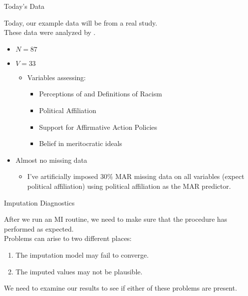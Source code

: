 \documentclass{beamer}
\begin{document}
\begin{frame}{Today's Data}
  
  Today, our example data will be from a real study.\\
  \vspace{12pt}
  These data were analyzed by \citet{langEtAl:2009}.\\
  \begin{itemize}
    \item $N = 87$
    \item $V = 33$
      \begin{itemize}
        \item Variables assessing: 
          \begin{itemize}
            \item Perceptions of and Definitions of Racism
            \item Political Affiliation
            \item Support for Affirmative Action Policies
            \item Belief in meritocratic ideals
          \end{itemize}
      \end{itemize}
      \vspace{6pt}
    \item Almost no missing data
      \begin{itemize}
        \item I've artificially imposed $30\%$ MAR missing data on all
          variables (expect political affiliation) using political
          affiliation as the MAR predictor.
      \end{itemize}
  \end{itemize}
  
\end{frame}



      
\begin{frame}{Imputation Diagnostics}

  After we run an MI routine, we need to make sure that the procedure
  has performed as expected.\\
  \vspace{12pt}
  Problems can arise to two different places:
  \begin{enumerate}
    \item The imputation model may fail to converge.
    \item The imputed values may not be plausible.
  \end{enumerate}
  \vspace{12pt} 
  We need to examine our results to see if either of
  these problems are present.
  
\end{frame}
\end{document}
